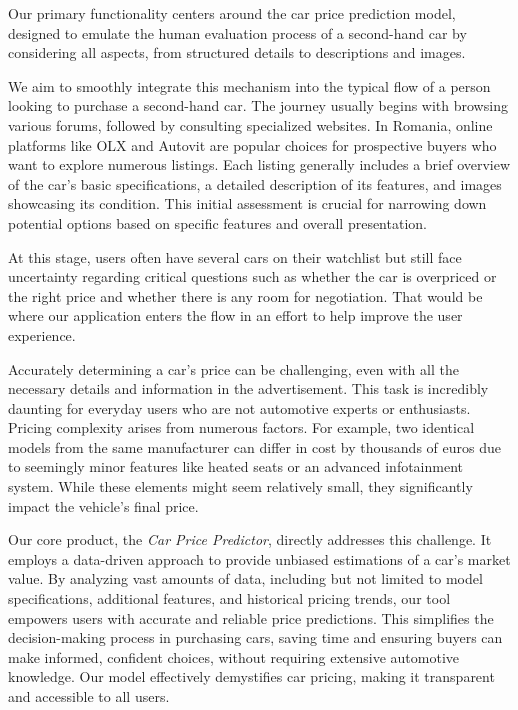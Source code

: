 Our primary functionality centers around the car price prediction model, designed to emulate the human evaluation process of a second-hand car by considering all aspects, from structured details to descriptions and images.

We aim to smoothly integrate this mechanism into the typical flow of a person looking to purchase a second-hand car. The journey usually begins with browsing various forums, followed by consulting specialized websites. In Romania, online platforms like OLX \cite{OLX} and Autovit \cite{Autovit} are popular choices for prospective buyers who want to explore numerous listings. Each listing generally includes a brief overview of the car's basic specifications, a detailed description of its features, and images showcasing its condition. This initial assessment is crucial for narrowing down potential options based on specific features and overall presentation.

At this stage, users often have several cars on their watchlist but still face uncertainty regarding critical questions such as whether the car is overpriced or the right price and whether there is any room for negotiation. That would be where our application enters the flow in an effort to help improve the user experience.

Accurately determining a car's price can be challenging, even with all the necessary details and information in the advertisement. This task is incredibly daunting for everyday users who are not automotive experts or enthusiasts. Pricing complexity arises from numerous factors. For example, two identical models from the same manufacturer can differ in cost by thousands of euros due to seemingly minor features like heated seats or an advanced infotainment system. While these elements might seem relatively small, they significantly impact the vehicle's final price.

Our core product, the \textit{Car Price Predictor}, directly addresses this challenge. It employs a data-driven approach to provide unbiased estimations of a car's market value. By analyzing vast amounts of data, including but not limited to model specifications, additional features, and historical pricing trends, our tool empowers users with accurate and reliable price predictions. This simplifies the decision-making process in purchasing cars, saving time and ensuring buyers can make informed, confident choices, without requiring extensive automotive knowledge. Our model effectively demystifies car pricing, making it transparent and accessible to all users.

